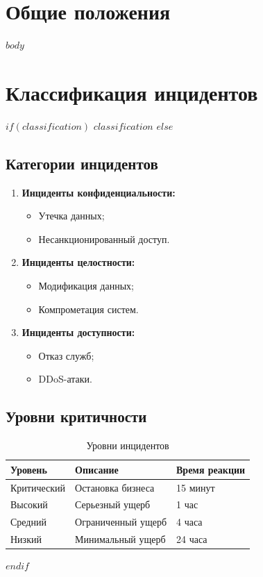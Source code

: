 \documentclass[14pt,a4paper]{extarticle}
\begin{document}
\makeTitlePage

\mainpagestyle
\tableofcontents
\newpage

\section{Общие положения}
\label{sec:general}

$body$

\section{Классификация инцидентов}
\label{sec:classification}

$if(classification)$
$classification$
$else$
\subsection{Категории инцидентов}
\begin{enumerate}
    \item \textbf{Инциденты конфиденциальности:}
    \begin{itemize}
        \item Утечка данных;
        \item Несанкционированный доступ.
    \end{itemize}
    
    \item \textbf{Инциденты целостности:}
    \begin{itemize}
        \item Модификация данных;
        \item Компрометация систем.
    \end{itemize}
    
    \item \textbf{Инциденты доступности:}
    \begin{itemize}
        \item Отказ служб;
        \item DDoS-атаки.
    \end{itemize}
\end{enumerate}

\subsection{Уровни критичности}
\begin{table}[h]
\centering
\caption{Уровни инцидентов}
\begin{tabular}{|l|l|l|}
\hline
\textbf{Уровень} & \textbf{Описание} & \textbf{Время реакции} \\
\hline
Критический & Остановка бизнеса & 15 минут \\
Высокий & Серьезный ущерб & 1 час \\
Средний & Ограниченный ущерб & 4 часа \\
Низкий & Минимальный ущерб & 24 часа \\
\hline
\end{tabular}
\end{table}
$endif$
\end{document}
